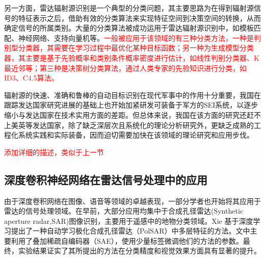 另一方面，雷达辐射源识别是一个典型的分类问题，其主要思路为在得到辐射源信号的特征表示之后，借助有效的分类算法来实现特征空间到决策空间的转换，从而确定信号的所属类别。大量的分类算法被成功运用于雷达辐射源识别中，如模板匹配\cite{dudczyk2015fast,dudczyk2004applying}、神经网络\cite{jouny1993classification,petrov2013identification,shieh2002vector,willson1990radar}、支持向量机\cite{ren2008radar}等。\textcolor{red}{一般被应用于该领域的有三种分类方法，一种是判别型分类器，其需要在学习过程中最优化某种目标函数；另一种为生成模型分类器，其主要是基于先验概率和类别条件概率密度进行估计，如线性判别分类器\cite{mika1999fisher}、K最近邻\cite{cover1967nearest}等；第三种是决策树分类算法，通过人类专家的先验知识进行分类，如ID3、C4.5算法\cite{quinlan1996bagging,lyden1999id1}。}

辐射源的快速、准确和鲁棒的自动目标识别在现代军事中的作用十分重要，我国在跟踪发达国家研究进展的基础上也开始加紧研发可装备于军方的SEI系统，以逐步缩小与发达国家在技术实用方面的差距。但总体来说，我国在该方面的研究还赶不上美英等发达国家，除了缺乏深层次且系统化的理论分析研究外，更缺乏成熟的工程化系统实践和实际装备，因而迫切需要加快在该领域的理论研究和应用步伐。


\textcolor{red}{添加详细的描述，类似于上一节}

\subsection{深度卷积神经网络在雷达信号处理中的应用}

由于深度卷积网络在图像、语音等领域的卓越表现，一部分学者也开始将其应用于雷达的信号处理领域。在早前，大部分应用均集中于合成孔径雷达(Synthetic aperture radar,SAR)图像识别，主要用于遥感中的地物分类领域\cite{chen2014sar,xie2014multilayer,lv2014classification}。Xie \cite{xie2014multilayer}基于深度学习提出了一种自动学习极化合成孔径雷达（PolSAR）中多层特征的方法。文中主要利用了叠加稀疏自编码器（SAE），使用少量标签微调他们的方法的参数。最终，实验结果证实了其所提出的方法在分类精度和视觉效果方面具有显著的提升。

